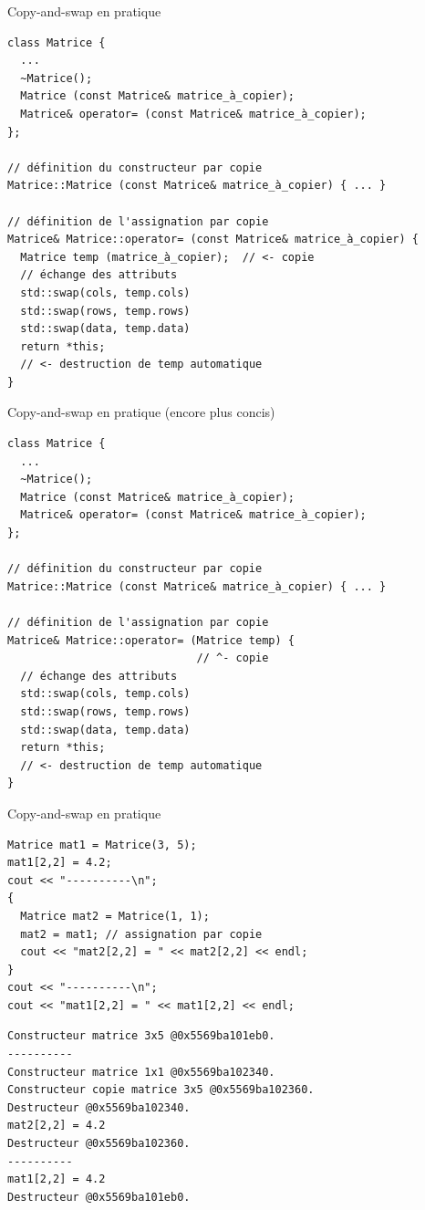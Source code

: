 \documentclass[c]{beamer}
\begin{document}
\begin{frame}[fragile]{Copy-and-swap en pratique}
\begin{verbatim}
class Matrice {
  ...
  ~Matrice();
  Matrice (const Matrice& matrice_à_copier);
  Matrice& operator= (const Matrice& matrice_à_copier);
};

// définition du constructeur par copie
Matrice::Matrice (const Matrice& matrice_à_copier) { ... }

// définition de l'assignation par copie
Matrice& Matrice::operator= (const Matrice& matrice_à_copier) {
  Matrice temp (matrice_à_copier);  // <- copie
  // échange des attributs
  std::swap(cols, temp.cols)
  std::swap(rows, temp.rows)
  std::swap(data, temp.data)
  return *this;
  // <- destruction de temp automatique
}
\end{verbatim}
\end{frame}


\begin{frame}[fragile]{Copy-and-swap en pratique (encore plus concis)}
\begin{verbatim}
class Matrice {
  ...
  ~Matrice();
  Matrice (const Matrice& matrice_à_copier);
  Matrice& operator= (const Matrice& matrice_à_copier);
};

// définition du constructeur par copie
Matrice::Matrice (const Matrice& matrice_à_copier) { ... }

// définition de l'assignation par copie
Matrice& Matrice::operator= (Matrice temp) {
                             // ^- copie
  // échange des attributs
  std::swap(cols, temp.cols)
  std::swap(rows, temp.rows)
  std::swap(data, temp.data)
  return *this;
  // <- destruction de temp automatique
}
\end{verbatim}
\end{frame}


\begin{frame}[fragile]{Copy-and-swap en pratique}

\begin{verbatim}
Matrice mat1 = Matrice(3, 5);
mat1[2,2] = 4.2;
cout << "----------\n";
{
  Matrice mat2 = Matrice(1, 1);
  mat2 = mat1; // assignation par copie
  cout << "mat2[2,2] = " << mat2[2,2] << endl;
}
cout << "----------\n";
cout << "mat1[2,2] = " << mat1[2,2] << endl;
\end{verbatim}
\pause
\begin{verbatim}
Constructeur matrice 3x5 @0x5569ba101eb0.
----------
Constructeur matrice 1x1 @0x5569ba102340.
Constructeur copie matrice 3x5 @0x5569ba102360.
Destructeur @0x5569ba102340.
mat2[2,2] = 4.2
Destructeur @0x5569ba102360.
----------
mat1[2,2] = 4.2
Destructeur @0x5569ba101eb0.
\end{verbatim}

\end{frame}
\end{document}
